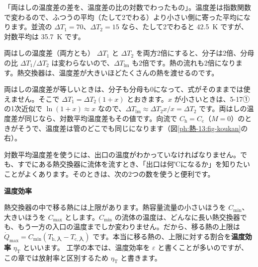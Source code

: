 \begin{phyomi}[$\Delta T_{\mathrm{lm}}=(\Delta T_1-\Delta T_2)/\ln(\Delta T_1/\Delta T_2)$]
「両はしの温度差の差を、温度差の比の対数でわったもの」。温度差は指数関数で変わるので、ふつうの平均（たして2でわる）より小さい側に寄った平均になります。並流の $\Delta T_1=70$、$\Delta T_2=15$ なら、たして2でわると \qty{42.5}{K} ですが、対数平均は \qty{35.7}{K} です。
\end{phyomi}
\begin{phbaisuru}{両はしの温度差（両方とも）}
$\Delta T_1$ と $\Delta T_2$ を両方2倍にすると、分子は2倍、分母の比 $\Delta T_1/\Delta T_2$ は変わらないので、$\Delta T_{\mathrm{lm}}$ も2倍です。熱の流れも2倍になります。熱交換器は、温度差が大きいほどたくさんの熱を渡せるのです。
\end{phbaisuru}

\begin{seikaku}
両はしの温度差が等しいときは、分子も分母も0になって、式がそのままでは使えません。そこで $\Delta T_1=\Delta T_2(1+x)$ とおきます。$x$ が小さいときは、5-17①の1次近似で $\ln(1+x)\approx x$ なので、$\Delta T_{\mathrm{lm}}\approx\Delta T_2x/x=\Delta T_2$ です。両はしの温度差が同じなら、対数平均温度差もその値です。向流で $C_{\mathrm h}=C_{\mathrm c}$（$M=0$）のときがそうで、温度差は管のどこでも同じになります（図\ref{ph:熱-13:fig-koukan}の右）。
\end{seikaku}


\leavevmode\label{ph:熱-13:sec9}対数平均温度差を使うには、出口の温度がわかっていなければなりません。でも、すでにある熱交換器に流体を流すとき、「出口は何℃になるか」を知りたいことがよくあります。そのときは、次の2つの数を使うと便利です。

\noindent\textbf{温度効率}\par\nobreak
熱交換器の中で移る熱には上限があります。熱容量流量の小さいほうを $C_{\min}$、大きいほうを $C_{\max}$ とします。$C_{\min}$ の流体の温度は、どんなに長い熱交換器でも、もう一方の入口の温度までしか変わりません。だから、移る熱の上限は $\dot Q_{\max}=C_{\min}(T_{\mathrm h,\text{入}}-T_{\mathrm c,\text{入}})$ です。本当に移る熱の、上限に対する割合を\textbf{温度効率} $\eta_{\mathrm T}$ といいます。
工学の本では、温度効率を $\varepsilon$ と書くことが多いのですが、この章では放射率と区別するため $\eta_{\mathrm T}$ と書きます。

